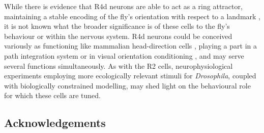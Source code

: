 \begin{comment}
How the visual information provided by these cells might be integrated in the general sensorimotor architecture of the central complex is still an open question. It might be PI or operant association of action + stimuli.

Condense: \\
R4d neurons could form part of a ‘path integration’ system \cite{Neuser2008} or be analogous to mammalian head-direction cells \cite{Tomchik2008}. Indeed, there is evidence that, as with path integration and head direction cells, these cells also integrate idiothetic information \cite{Zars2009}. This raises the intriguing possibility that ring neurons play a role in a short-term memory system in order to facilitate complex behavioural responses which require integration of multiple sources of information over time, rather than simpler reflexive or classically conditioned behaviours. The fly could be remembering the position of a stimulus, the history of its own movements, or both \cite{Tomchik2008}. Work by \cite{Guo2015} indicates that R3/R4d neurons, but not R2/R4m, play a role in learned spatial orientation to stimuli other than simple vertical bars. Flies tethered in a drum were conditioned to fly toward either the left or right of a visual pattern (such as an inverted ‘T’); it was found that the absence of these neurons prevented conditioning. This suggests a role for R4d cells in remembering the position of a stimulus with respect to the fly’s own movements, as would be required in a path integration system.
\end{comment}

While there is evidence that R4d neurons are able to act as a ring attractor, maintaining a stable encoding of the fly's orientation with respect to a landmark \cite{Seelig2015}, it is not known what the broader significance is of these cells to the fly's behaviour or within the nervous system.
R4d neurons could be conceived variously as functioning like mammalian head-direction cells \cite{Tomchik2008}, playing a part in a path integration system \cite{Neuser2008} or in visual orientation conditioning \cite{Guo2015}, and may serve several functions simultaneously.
As with the R2 cells, neurophysiological experiments employing more ecologically relevant stimuli for \emph{Drosophila}, coupled with biologically constrained modelling, may shed light on the behavioural role for which these cells are tuned.

\subsection*{Acknowledgements}


